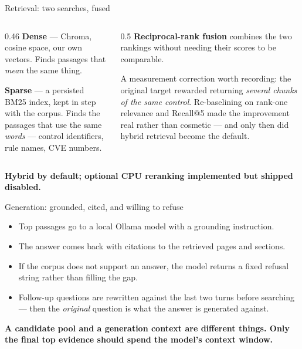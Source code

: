 \documentclass[aspectratio=169,11pt]{beamer}
\newcommand{\keytake}[1]{%
  \vfill
  \noindent\colorbox{accenttint}{%
    \begin{minipage}{\dimexpr\textwidth-2\fboxsep-2\fboxrule\relax}
      \vspace{2pt}
      \small\color{accent}\textbf{#1}
      \vspace{2pt}
    \end{minipage}}\par}
\begin{document}
\begin{frame}{Retrieval: two searches, fused}
  \begin{columns}[T,onlytextwidth]
    \begin{column}{0.46\textwidth}
      \textbf{\color{accent}Dense} --- Chroma, cosine space, our own vectors. Finds passages that \emph{mean} the same thing.
      \vspace{0.8em}

      \textbf{\color{accent}Sparse} --- a persisted BM25 index, kept in step with the corpus. Finds the passages that use the same \emph{words} --- control identifiers, rule names, CVE numbers.
    \end{column}
    \begin{column}{0.5\textwidth}
      \textbf{\color{accent}Reciprocal-rank fusion} combines the two rankings without needing their scores to be comparable.
      \vspace{0.8em}

      A measurement correction worth recording: the original target rewarded returning
      \emph{several chunks of the same control}. Re-baselining on rank-one relevance and
      Recall@5 made the improvement real rather than cosmetic --- and only then did hybrid
      retrieval become the default.
    \end{column}
  \end{columns}
  \keytake{Hybrid by default; optional CPU reranking implemented but shipped disabled.}
\end{frame}

\begin{frame}{Generation: grounded, cited, and willing to refuse}
  \begin{itemize}
    \item Top passages go to a local Ollama model with a grounding instruction.
    \item The answer comes back with citations to the retrieved pages and sections.
    \item If the corpus does not support an answer, the model returns a fixed refusal string
      rather than filling the gap.
    \item Follow-up questions are rewritten against the last two turns before searching ---
      then the \emph{original} question is what the answer is generated against.
  \end{itemize}
  \keytake{A candidate pool and a generation context are different things. Only the final top evidence should spend the model's context window.}
\end{frame}
\end{document}
